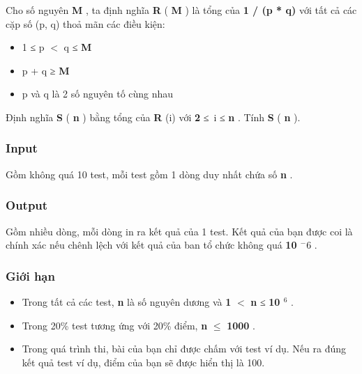 





   Cho số nguyên   \textbf{    M   }   , ta định nghĩa   \textbf{    R   }   (   \textbf{    M   }   ) là tổng của   \textbf{    1 / (p * q)   }   với tất cả các cặp số (p, q) thoả mãn các điều kiện:  
\begin{itemize}
	\item     1 ≤ p $<$ q ≤    \textbf{     M    }
	\item     p + q ≥    \textbf{     M    }
	\item     p và q là 2 số nguyên tố cùng nhau   
\end{itemize}

   Định nghĩa   \textbf{    S   }   (   \textbf{    n   }   ) bằng tổng của   \textbf{    R   }   (i) với   \textbf{    2   }   ≤ i ≤   \textbf{    n   }   . Tính   \textbf{    S   }   (   \textbf{    n   }   ).  

\subsubsection{   Input  }

   Gồm không quá 10 test, mỗi test gồm 1 dòng duy nhất chứa số   \textbf{    n   }   .  

\subsubsection{   Output  }

   Gồm nhiều dòng, mỗi dòng in ra kết quả của 1 test. Kết quả của bạn được coi là chính xác nếu chênh lệch với kết quả của ban tổ chức không quá   \textbf{    10    $^     -6    $}   .  

\subsubsection{   Giới hạn  }
\begin{itemize}
	\item     Trong tất cả các test,    \textbf{     n    }    là số nguyên dương và    \textbf{     1    }    $<$    \textbf{     n    }    ≤    \textbf{     10     $^      6     $}    .   
	\item     Trong 20\% test tương ứng với 20\% điểm,    \textbf{     n    }     $\le$     \textbf{     1000    }    .   
	\item     Trong quá trình thi, bài của bạn chỉ được chấm với test ví dụ. Nếu ra đúng kết quả test ví dụ, điểm của bạn sẽ được hiển thị là 100.   
\end{itemize}

